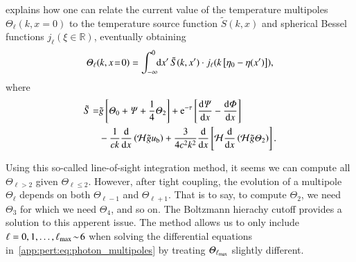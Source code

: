     \citet{Callin2006} explains how one can relate the current value of the temperature multipoles $\Theta_\ell(k, x\!=\!0)$ to the temperature source function $\tilde{S}(k, x)$ and spherical Bessel functions $j_\ell(\xi\!\in\!\mathbb{R})$, eventually obtaining
    \begin{equation}
        \varTheta_\ell (k, x\!=\!0) = \int_{-\infty}^{0}\!\!\mathop{}\!\mathrm{d} {x'}\, \tilde{S}(k,x') \cdot j_\ell(k \left[\eta_0 - \eta(x')\right]),
    \end{equation}
    where
    \begin{equation}\label{mil3:theo:eq:source_function}
    \begin{split}
        \tilde{S} =& \gti \left[\Theta_0 + \Psi + \frac{1}{4}\Theta_2\right] + \eu[-\tau]\left[ \dv{\Psi}{x} -\dv{\Phi}{x} \right] \\
        &- \frac{1}{ck} \dv{}{x}\left(\Hp \gti u\ped{b} \right) + \frac{3}{4c^2k^2}\dv{}{x}\left[ \Hp \dv{}{x}\left(\Hp \gti\Theta_2 \right)  \right].
    \end{split}
    \end{equation}

    Using this so-called line-of-sight integration method, it seems we can compute all $\Theta_{\ell>2}$ given $\Theta_{\ell\leq 2}$. However, after tight coupling, the evolution of a multipole $\Theta_\ell$ depends on both $\Theta_{\ell-1}$ and $\Theta_{\ell+1}$. That is to say, to compute $\Theta_2$, we need $\Theta_3$ for which we need $\Theta_4$, and so on. The Boltzmann hierachy cutoff provides a solution to this apperent issue. The method allows us to only include $\ell=0, 1, \dots, \ell_\mathrm{max}\!\sim\! 6$ when solving the differential equations in~\cref{app:pert:eq:photon_multipoles} by treating $\varTheta_{\ell_\mathrm{max}}$ slightly different. 
    

